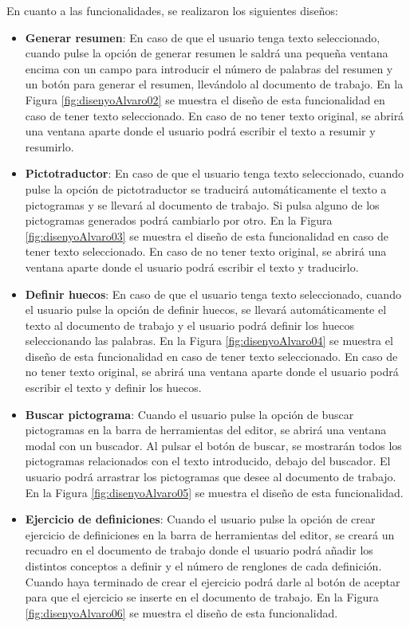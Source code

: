 En cuanto a las funcionalidades, se realizaron los siguientes diseños:
\begin{itemize}
  \item \textbf{Generar resumen}: En caso de que el usuario tenga texto seleccionado, cuando pulse la opción de generar resumen le saldrá una pequeña ventana encima con un campo para introducir el número de palabras del resumen y un botón para generar el resumen, llevándolo al documento de trabajo. En la Figura \ref{fig:disenyoAlvaro02} se muestra el diseño de esta funcionalidad en caso de tener texto seleccionado. En caso de no tener texto original, se abrirá una ventana aparte donde el usuario podrá escribir el texto a resumir y resumirlo.
  \item \textbf{Pictotraductor}: En caso de que el usuario tenga texto seleccionado, cuando pulse la opción de pictotraductor se traducirá automáticamente el texto a pictogramas y se llevará al documento de trabajo. Si pulsa alguno de los pictogramas generados podrá cambiarlo por otro. En la Figura \ref{fig:disenyoAlvaro03} se muestra el diseño de esta funcionalidad en caso de tener texto seleccionado. En caso de no tener texto original, se abrirá una ventana aparte donde el usuario podrá escribir el texto y traducirlo.
  \item \textbf{Definir huecos}: En caso de que el usuario tenga texto seleccionado, cuando el usuario pulse la opción de definir huecos, se llevará automáticamente el texto al documento de trabajo y el usuario podrá definir los huecos seleccionando las palabras. En la Figura \ref{fig:disenyoAlvaro04} se muestra el diseño de esta funcionalidad en caso de tener texto seleccionado. En caso de no tener texto original, se abrirá una ventana aparte donde el usuario podrá escribir el texto y definir los huecos.
  \item \textbf{Buscar pictograma}: Cuando el usuario pulse la opción de buscar pictogramas en la barra de herramientas del editor, se abrirá una ventana modal con un buscador. Al pulsar el botón de buscar, se mostrarán todos los pictogramas relacionados con el texto introducido, debajo del buscador. El usuario podrá arrastrar los pictogramas que desee al documento de trabajo. En la Figura \ref{fig:disenyoAlvaro05} se muestra el diseño de esta funcionalidad.
  \item \textbf{Ejercicio de definiciones}: Cuando el usuario pulse la opción de crear ejercicio de definiciones en la barra de herramientas del editor, se creará un recuadro en el documento de trabajo donde el usuario podrá añadir los distintos conceptos a definir y el número de renglones de cada definición. Cuando haya terminado de crear el ejercicio podrá darle al botón de aceptar para que el ejercicio se inserte en el documento de trabajo. En la Figura \ref{fig:disenyoAlvaro06} se muestra el diseño de esta funcionalidad.

\end{itemize}
